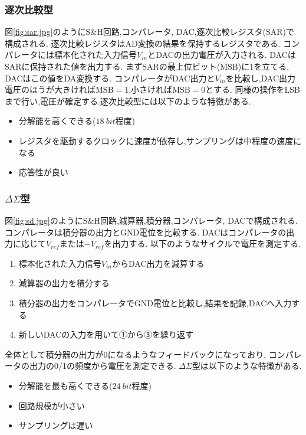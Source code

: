 \subsubsection{逐次比較型}
図\ref{fig:sar.jpg}のように$\mathrm{S\&H}$回路,コンパレータ, DAC,逐次比較レジスタ(SAR)で構成される.
逐次比較レジスタはAD変換の結果を保持するレジスタである.
コンパレータには標本化された入力信号$V_{in}$とDACの出力電圧が入力される. DACはSARに保持された値を出力する.
まずSARの最上位ビット($\mathrm{MSB}$)に1を立てる, DACはこの値をDA変換する.
コンパレータがDAC出力と$V_{in}$を比較し,DAC出力電圧のほうが大きければ$\mathrm{MSB}=1$,小さければ$\mathrm{MSB}=0$とする.
同様の操作をLSBまで行い,電圧が確定する.逐次比較型には以下のような特徴がある.
\begin{itemize}
  \item 分解能を高くできる($18~\si{bit}$程度)
  \item レジスタを駆動するクロックに速度が依存し,サンプリングは中程度の速度になる
  \item 応答性が良い
\end{itemize}
\subsubsection{$\Delta\Sigma$型}
図\ref{fig:sd.jpg}のように$\mathrm{S\&H}$回路,減算器,積分器,コンパレータ, DACで構成される.
コンパレータは積分器の出力とGND電位を比較する.
DACはコンパレータの出力に応じて$V_{ref}$または$-V_{ref}$を出力する.
以下のようなサイクルで電圧を測定する\cite{toshiba}.
\begin{enumerate}
  \item 標本化された入力信号$V_{in}$からDAC出力を減算する
  \item 減算器の出力を積分する
  \item 積分器の出力をコンパレータでGND電位と比較し,結果を記録,DACへ入力する
  \item 新しいDACの入力を用いて①から③を繰り返す
\end{enumerate}
全体として積分器の出力が0になるようなフィードバックになっており,
コンパレータの出力の0/1の頻度から電圧を測定できる.
$\Delta\Sigma$型は以下のような特徴がある.
\begin{itemize}
  \item 分解能を最も高くできる($24~\si{bit}$程度)
  \item 回路規模が小さい
  \item サンプリングは遅い
\end{itemize}
